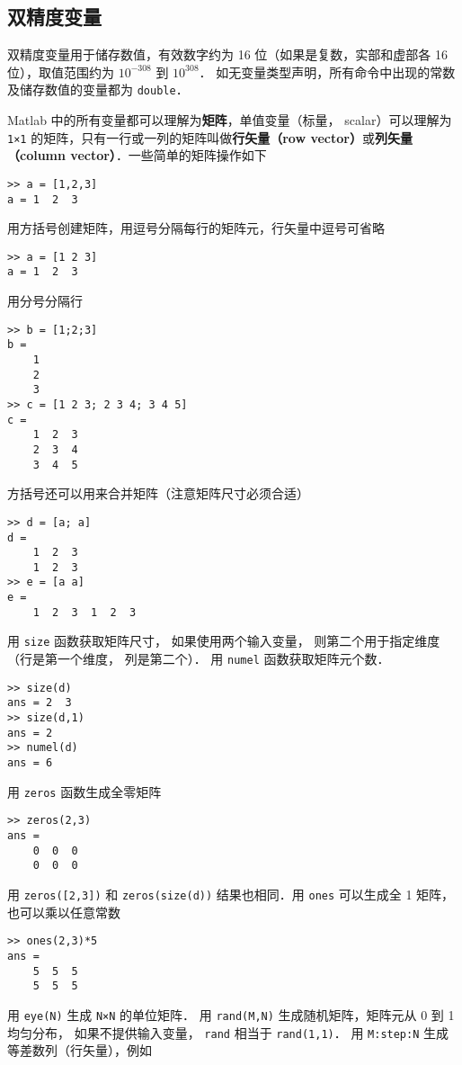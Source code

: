 \subsection{双精度变量}

双精度变量用于储存数值，有效数字约为 16 位（如果是复数，实部和虚部各 16 位），取值范围约为 $10^{-308}$ 到 $10^{308}$． 如无变量类型声明，所有命令中出现的常数及储存数值的变量都为 \lstinline|double|．

Matlab 中的所有变量都可以理解为\textbf{矩阵}，单值变量（标量， scalar）可以理解为 \lstinline|1×1| 的矩阵，只有一行或一列的矩阵叫做\textbf{行矢量（row vector）}或\textbf{列矢量（column vector）}．一些简单的矩阵操作如下
\begin{lstlisting}[language=MatlabCom]
>> a = [1,2,3]
a = 1  2  3
\end{lstlisting}
用方括号创建矩阵，用逗号分隔每行的矩阵元，行矢量中逗号可省略%
\begin{lstlisting}[language=MatlabCom]
>> a = [1 2 3]
a = 1  2  3
\end{lstlisting}
用分号分隔行
\begin{lstlisting}[language=MatlabCom]
>> b = [1;2;3]
b =
    1
    2
    3
>> c = [1 2 3; 2 3 4; 3 4 5]
c =
    1  2  3
    2  3  4
    3  4  5
\end{lstlisting}
方括号还可以用来合并矩阵（注意矩阵尺寸必须合适）
\begin{lstlisting}[language=MatlabCom]
>> d = [a; a]
d =
    1  2  3
    1  2  3
>> e = [a a]
e =
    1  2  3  1  2  3
\end{lstlisting}
用 \lstinline|size| 函数获取矩阵尺寸， 如果使用两个输入变量， 则第二个用于指定维度（行是第一个维度， 列是第二个）． 用 \lstinline|numel| 函数获取矩阵元个数．
\begin{lstlisting}[language=MatlabCom]
>> size(d)
ans = 2  3
>> size(d,1)
ans = 2
>> numel(d)
ans = 6
\end{lstlisting}
用 \lstinline|zeros| 函数生成全零矩阵
\begin{lstlisting}[language=MatlabCom]
>> zeros(2,3)
ans =
    0  0  0
    0  0  0
\end{lstlisting}
用 \lstinline|zeros([2,3])| 和 \lstinline|zeros(size(d))| 结果也相同．用 \lstinline|ones| 可以生成全 1 矩阵，也可以乘以任意常数
\begin{lstlisting}[language=MatlabCom]
>> ones(2,3)*5
ans =
    5  5  5
    5  5  5
\end{lstlisting}
用 \lstinline|eye(N)| 生成 \lstinline|N×N| 的单位矩阵． 用 \lstinline|rand(M,N)| 生成随机矩阵，矩阵元从 0 到 1 均匀分布， 如果不提供输入变量， \lstinline|rand| 相当于 \lstinline|rand(1,1)|． 用 \lstinline|M:step:N| 生成等差数列（行矢量），例如
